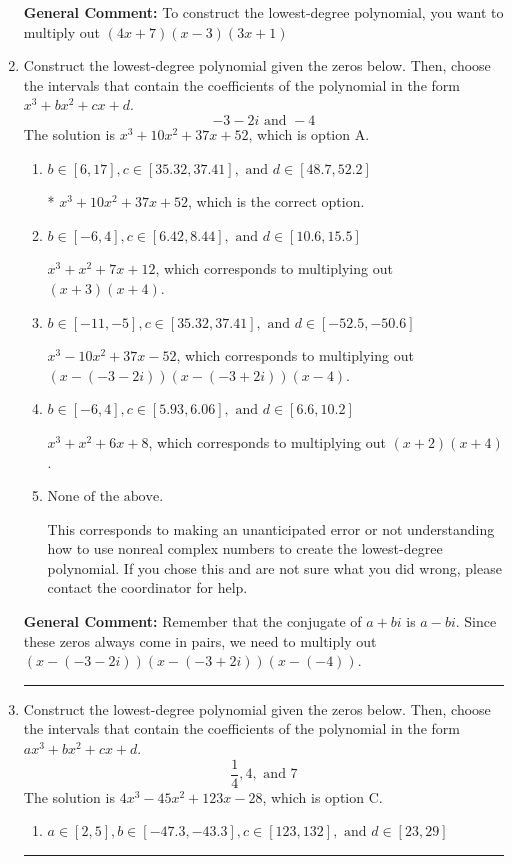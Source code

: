 \documentclass{extbook}[14pt]
\newcommand{\litem}[1]{\item #1

\rule{\textwidth}{0.4pt}}
\begin{document}
\begin{enumerate}
{\textbf{General Comment:} To construct the lowest-degree polynomial, you want to multiply out $(4x + 7)(x -3)(3x + 1)$
}
\litem{
Construct the lowest-degree polynomial given the zeros below. Then, choose the intervals that contain the coefficients of the polynomial in the form $x^3+bx^2+cx+d$.
\[ -3 - 2 i \text{ and } -4 \]
The solution is \( x^{3} +10 x^{2} +37 x + 52 \), which is option A.\begin{enumerate}[label=\Alph*.]
\item \( b \in [6, 17], c \in [35.32, 37.41], \text{ and } d \in [48.7, 52.2] \)

* $x^{3} +10 x^{2} +37 x + 52$, which is the correct option.
\item \( b \in [-6, 4], c \in [6.42, 8.44], \text{ and } d \in [10.6, 15.5] \)

$x^{3} + x^{2} +7 x + 12$, which corresponds to multiplying out $(x + 3)(x + 4)$.
\item \( b \in [-11, -5], c \in [35.32, 37.41], \text{ and } d \in [-52.5, -50.6] \)

$x^{3} -10 x^{2} +37 x -52$, which corresponds to multiplying out $(x-(-3 - 2 i))(x-(-3 + 2 i))(x -4)$.
\item \( b \in [-6, 4], c \in [5.93, 6.06], \text{ and } d \in [6.6, 10.2] \)

$x^{3} + x^{2} +6 x + 8$, which corresponds to multiplying out $(x + 2)(x + 4)$.
\item \( \text{None of the above.} \)

This corresponds to making an unanticipated error or not understanding how to use nonreal complex numbers to create the lowest-degree polynomial. If you chose this and are not sure what you did wrong, please contact the coordinator for help.
\end{enumerate}

\textbf{General Comment:} Remember that the conjugate of $a+bi$ is $a-bi$. Since these zeros always come in pairs, we need to multiply out $(x-(-3 - 2 i))(x-(-3 + 2 i))(x-(-4))$.
}
\litem{
Construct the lowest-degree polynomial given the zeros below. Then, choose the intervals that contain the coefficients of the polynomial in the form $ax^3+bx^2+cx+d$.
\[ \frac{1}{4}, 4, \text{ and } 7 \]
The solution is \( 4x^{3} -45 x^{2} +123 x -28 \), which is option C.\begin{enumerate}[label=\Alph*.]
\item \( a \in [2, 5], b \in [-47.3, -43.3], c \in [123, 132], \text{ and } d \in [23, 29] \)


\end{enumerate}}
\end{enumerate}
\end{document}

